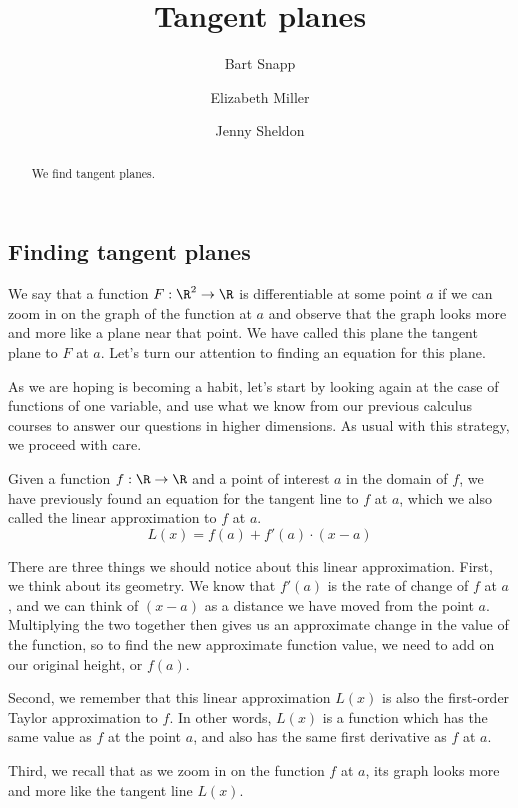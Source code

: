\documentclass{ximera}
\author{Bart Snapp \and Elizabeth Miller \and Jenny Sheldon}
\title[Dig-In:]{Tangent planes}
\begin{document}
\begin{abstract}
  We find tangent planes.
\end{abstract}
\maketitle



\subsection{Finding tangent planes}

We say that a function $F: \R^2 \to \R$ is differentiable at some point $a$ if we can 
zoom in on the graph of the function at $a$ and observe that the graph looks more 
and more like a plane near that point.  We have called this plane the tangent plane 
to $F$ at $a$. Let's turn our attention to finding an equation for this plane.

As we are hoping is becoming a habit, let's start by looking again at the case of 
functions of one variable, and use what we know from our previous calculus courses 
to answer our questions in higher dimensions.  As usual with this strategy, we 
proceed with care.

Given a function $f : \R \to \R$ and a point of interest $a$ in the domain of $f$, we 
have previously found an equation for the tangent line to $f$ at $a$, which we also 
called the linear approximation to $f$ at $a$.
\[
L(x) = f(a) + f'(a) \cdot (x-a)
\]

There are three things we should notice about this linear approximation.  First, we 
think about its geometry.  We know that $f'(a)$ is the rate of change of $f$ at $a$, 
and we can think of $(x-a)$ as a distance we have moved from the point $a$.  
Multiplying the two together then gives us an approximate change in the value of the 
function, so to find the new approximate function value, we need to add on our 
original height, or $f(a)$.

Second, we remember that this linear approximation $L(x)$ is also the first-order 
Taylor approximation to $f$.  In other words, $L(x)$ is a function which has the same 
value as $f$ at the point $a$, and also has the same first derivative as $f$ at $a$.

Third, we recall that as we zoom in on the function $f$ at $a$, its graph looks more 
and more like the tangent line $L(x)$.
\end{document}
